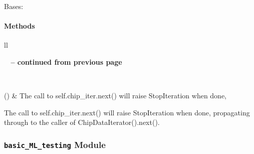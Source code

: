 \documentclass[letterpaper,10pt,english]{sphinxmanual}
\begin{document}
\begin{fulllineitems}
\label{qikify.recipes:qikify.recipes.atesim.ChipDataIterator}
Bases: 
\paragraph{Methods}

\begin{longtable}{ll}
\hline
\endfirsthead

%
{{\bfseries \tablename\ \thetable{} -- continued from previous page}} \\
\hline
\endhead

\hline {} \\ \hline
\endfoot

\hline
\endlastfoot


{\hyperref[qikify.recipes:qikify.recipes.atesim.ChipDataIterator.next]{}}()
 & 
The call to self.chip\_iter.next() will raise StopIteration when done,
\\\hline
\end{longtable}


\begin{fulllineitems}
\label{qikify.recipes:qikify.recipes.atesim.ChipDataIterator.next}
The call to self.chip\_iter.next() will raise StopIteration when done, 
propagating through to the caller of ChipDataIterator().next().

\end{fulllineitems}


\end{fulllineitems}



\subsubsection{\texttt{basic\_ML\_testing} Module}
\label{qikify.recipes:module-qikify.recipes.basic_ML_testing}\label{qikify.recipes:basic-ml-testing-module}
\end{document}

